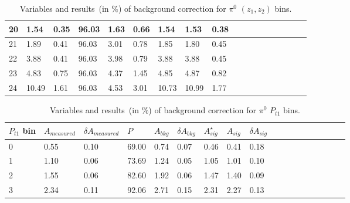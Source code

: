 \begin{table}[H]
\begin{tabular}{|l|l|l|l|l|l|l|l|l|l|l|l|l|l|l|l|l|l|}
20 & 1.54 & 0.35 & 96.03 & 1.63 & 0.66 & 1.54 & 1.53 & 0.38 \\ \hline 
21 & 1.89 & 0.41 & 96.03 & 3.01 & 0.78 & 1.85 & 1.80 & 0.45 \\ \hline 
22 & 3.88 & 0.41 & 96.03 & 3.98 & 0.79 & 3.88 & 3.88 & 0.45 \\ \hline 
23 & 4.83 & 0.75 & 96.03 & 4.37 & 1.45 & 4.85 & 4.87 & 0.82 \\ \hline 
24 & 10.49 & 1.61 & 96.03 & 4.53 & 3.01 & 10.73 & 10.99 & 1.77 \\ \hline 
\end{tabular}
\caption{Variables and results~(in $\%$) of background correction for $\pi^0$ $(z_1,z_2)$ bins. }
\label{tab:comzbkgcor}
\end{table} 

\begin{table}[H]\footnotesize
\centering
\begin{tabular}{|l|l|l|l|l|l|l|l|l|l|l|l|l|l|l|l|l|l|}
\\ \hline
$P_{t1}$ bin & $A_{measured}$ & $\delta A_{measured}$ & $P$& $A_{bkg}$ & $\delta A_{bkg}$ & $A_{sig}^{\star}$ & $ A_{sig}$ & $\delta A_{sig}$ \\ \hline
0 & 0.55 & 0.10 & 69.00 & 0.74 & 0.07 & 0.46 & 0.41 & 0.18 \\ \hline 
1 & 1.10 & 0.06 & 73.69 & 1.24 & 0.05 & 1.05 & 1.01 & 0.10 \\ \hline 
2 & 1.55 & 0.06 & 82.60 & 1.92 & 0.06 & 1.47 & 1.40 & 0.09 \\ \hline 
3 & 2.34 & 0.11 & 92.06 & 2.71 & 0.15 & 2.31 & 2.27 & 0.13 \\ \hline 
\end{tabular}
\caption{Variables and results~(in $\%$) of background correction for $\pi^0$ $P_{t1}$ bins. }
\label{tab:sinptbkgcor}
\end{table}

